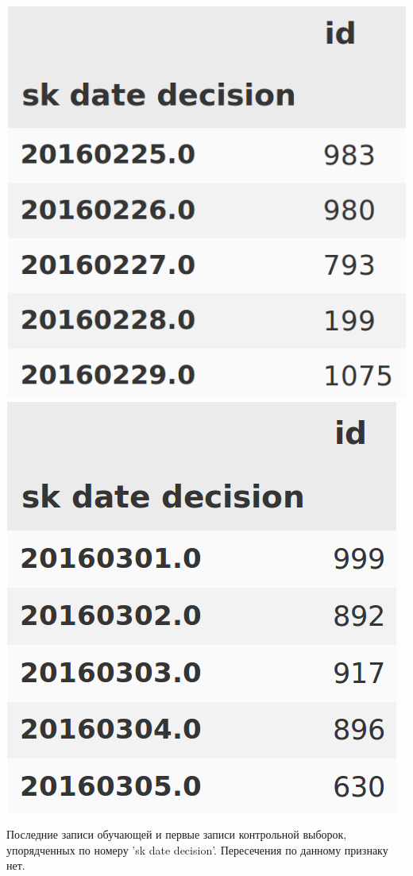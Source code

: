 \documentclass[russian, 10pt]{beamer}
\begin{document}
\begin{frame}


\includegraphics[scale=0.3]{images/sk_train.png}
\includegraphics[scale=0.31]{images/sk_test.png}

Последние записи обучающей и первые записи контрольной выборок, упорядченных по номеру 'sk date decision'. Пересечения по данному признаку нет.
\end{frame}
\end{document}
